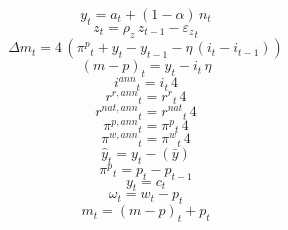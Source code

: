 \begin{dmath}
{{y}}_{t}={{a}}_{t}+\left(1-{{\alpha}}\right)\, {{n}}_{t}
\end{dmath}
\begin{dmath}
{{z}}_{t}={{\rho_{z}}}\, {{z}}_{t-1}-{{\varepsilon_z}}_{t}
\end{dmath}
\begin{dmath}
{{\Delta m}}_{t}=4\, \left({{\pi^p}}_{t}+{{y}}_{t}-{{y}}_{t-1}-{{\eta}}\, \left({{i}}_{t}-{{i}}_{t-1}\right)\right)
\end{dmath}
\begin{dmath}
{{(m-p)}}_{t}={{y}}_{t}-{{i}}_{t}\, {{\eta}}
\end{dmath}
\begin{dmath}
{{i^{ann}}}_{t}={{i}}_{t}\, 4
\end{dmath}
\begin{dmath}
{{r^{r,ann}}}_{t}={{r^r}}_{t}\, 4
\end{dmath}
\begin{dmath}
{{r^{nat,ann}}}_{t}={{r^{nat}}}_{t}\, 4
\end{dmath}
\begin{dmath}
{{\pi^{p,ann}}}_{t}={{\pi^p}}_{t}\, 4
\end{dmath}
\begin{dmath}
{{\pi^{w,ann}}}_{t}={{\pi^w}}_{t}\, 4
\end{dmath}
\begin{dmath}
{{\hat y}}_{t}={{y}}_{t}-(\bar{{y}})
\end{dmath}
\begin{dmath}
{{\pi^p}}_{t}={{p}}_{t}-{{p}}_{t-1}
\end{dmath}
\begin{dmath}
{{y}}_{t}={{c}}_{t}
\end{dmath}
\begin{dmath}
{\omega}_{t}={{w}}_{t}-{{p}}_{t}
\end{dmath}
\begin{dmath}
{{m}}_{t}={{(m-p)}}_{t}+{{p}}_{t}
\end{dmath}
